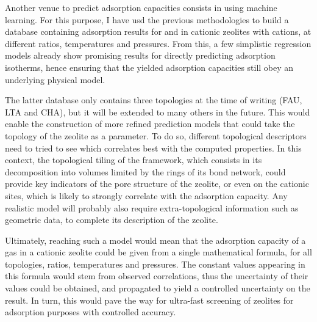 Another venue to predict adsorption capacities consists in using machine learning. For this purpose, I have usd the previous methodologies to build a database containing adsorption results for  and  in cationic zeolites with  cations, at different \SiAl ratios, temperatures and pressures. From this, a few simplistic regression models already show promising results for directly predicting adsorption isotherms, hence ensuring that the yielded adsorption capacities still obey an underlying physical model.

The latter database only contains three topologies at the time of writing (FAU, LTA and CHA), but it will be extended to many others in the future. This would enable the construction of more refined prediction models that could take the topology of the zeolite as a parameter. To do so, different topological descriptors need to tried to see which correlates best with the computed properties. In this context, the topological tiling of the framework, which consists in its decomposition into volumes limited by the rings of its bond network, could provide key indicators of the pore structure of the zeolite, or even on the cationic sites, which is likely to strongly correlate with the adsorption capacity. Any realistic model will probably also require extra-topological information such as geometric data, to complete its description of the zeolite.

Ultimately, reaching such a model would mean that the adsorption capacity of a gas in a cationic zeolite could be given from a single mathematical formula, for all topologies, \SiAl ratios, temperatures and pressures. The constant values appearing in this formula would stem from observed correlations, thus the uncertainty of their values could be obtained, and propagated to yield a controlled uncertainty on the result. In turn, this would pave the way for ultra-fast screening of zeolites for adsorption purposes with controlled accuracy.

